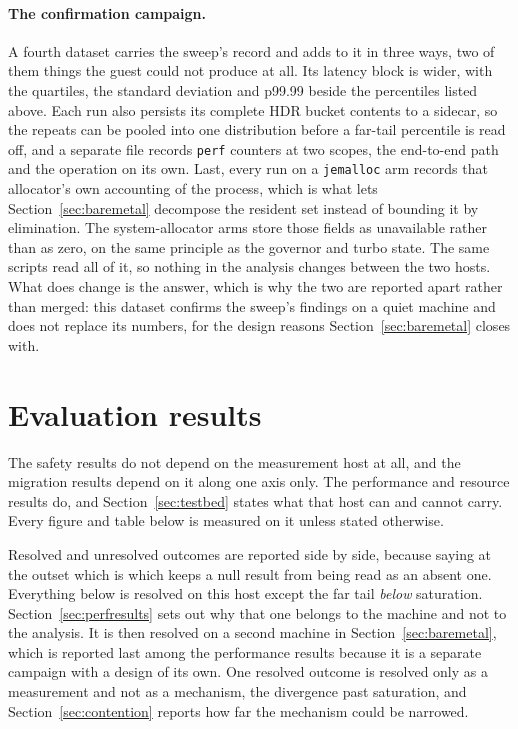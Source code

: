\documentclass[english,oneside,a4paper,censored,csm,software-track-2020]{HYthesisML}
\begin{document}
\paragraph{The confirmation campaign.}
A fourth dataset carries the sweep's record and adds to it in three ways, two of them things the
guest could not produce at all. Its latency block is wider, with the quartiles, the standard
deviation and p99.99 beside the percentiles listed above. Each run also persists its complete HDR
bucket contents to a sidecar, so the repeats can be pooled into one distribution before a far-tail
percentile is read off, and a separate file records \texttt{perf} counters at two scopes, the
end-to-end path and the operation on its own. Last, every run on a \texttt{jemalloc} arm records
that allocator's own accounting of the process, which is what lets
Section~\ref{sec:baremetal} decompose the resident set instead of bounding it by elimination. The
system-allocator arms store those fields as unavailable rather than as zero, on the same principle as
the governor and turbo state. The same scripts read all of it, so nothing
in the analysis changes between the two hosts. What does change is the answer, which is why the two
are reported apart rather than merged: this dataset confirms the sweep's findings on a quiet machine
and does not replace its numbers, for the design reasons Section~\ref{sec:baremetal} closes with.

\section{Evaluation results}
The safety results do not depend on the measurement host at all, and the migration results depend
on it along one axis only. The performance and resource results do, and
Section~\ref{sec:testbed} states what that host can and cannot carry. Every figure and table
below is measured on it unless stated otherwise.

Resolved and unresolved outcomes are reported side by side, because saying at the outset which is
which keeps a null result from being read as an absent one. Everything below is resolved on this
host except the far tail \emph{below} saturation.
Section~\ref{sec:perfresults} sets out why that one belongs to the machine and not to the
analysis. It is then resolved on a second machine in Section~\ref{sec:baremetal}, which is
reported last among the performance results because it is a separate campaign with a design of
its own. One resolved outcome is resolved only as a measurement and not as a mechanism, the
divergence past saturation, and Section~\ref{sec:contention} reports how far the mechanism could
be narrowed.
\end{document}
